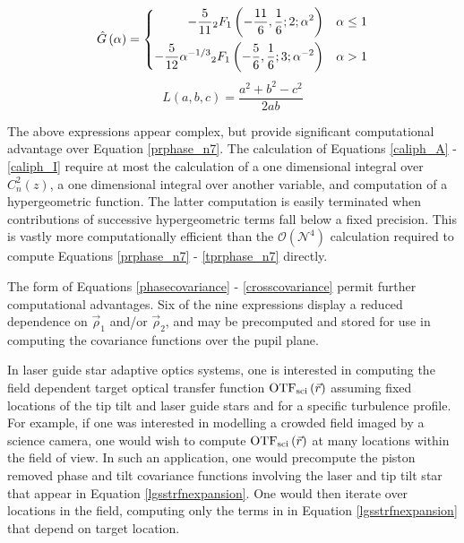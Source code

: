 \begin{equation}\label{G_hat_eqn}
\hat{G}\left(\alpha\right) = 
\left\{
\begin{aligned}
-\frac{5}{11} \vphantom{F}_{2}F_{1}\left(-\frac{11}{6}, \frac{1}{6};2; \alpha^{2}\right)              & \quad \alpha\le 1 \\
-\frac{5}{12} \alpha^{-1/3} \vphantom{F}_{2}F_{1}\left(-\frac{5}{6}, \frac{1}{6};3; \alpha^{-2}\right)  & \quad \alpha > 1
\end{aligned}
\right.
\end{equation}
\begin{equation}
L\left(a, b, c\right) = \frac{a^{2} + b^{2} - c^{2}}{2 a b}
\end{equation}

The above expressions appear complex, but provide significant
computational advantage over Equation \ref{prphase_n7}.  The
calculation of Equations \ref{caliph_A} - \ref{caliph_I} require at
most the calculation of a one dimensional integral over
$C_{n}^{2}(z)$, a one dimensional integral over another variable, and
computation of a hypergeometric function.  The latter computation is
easily terminated when contributions of successive hypergeometric
terms fall below a fixed precision.  This is vastly more
computationally efficient than the $\mathcal{O}(\mathcal{N}^{4})$
calculation required to compute Equations \ref{prphase_n7} -
\ref{tprphase_n7} directly.

The form of Equations \ref{phasecovariance} - \ref{crosscovariance}
permit further computational advantages.  Six of the nine expressions
display a reduced dependence on $\vec{\rho}_{1}$ and/or
$\vec{\rho}_{2}$, and may be precomputed and stored for use in
computing the covariance functions over the pupil plane.

In laser guide star adaptive optics systems, one is interested in
computing the field dependent target optical transfer function
${\rm OTF}_{\rm sci}\left(\vec{r}\right)$ assuming fixed locations of
the tip tilt and laser guide stars and for a specific turbulence
profile.  For example, if one was interested in modelling a crowded
field imaged by a science camera, one would wish to compute ${\rm OTF}_{\rm
  sci}\left(\vec{r}\right)$ at many locations within the field
of view.  In such an application, one would precompute the piston
removed phase and tilt covariance functions involving the laser and
tip tilt star that appear in Equation \ref{lgsstrfnexpansion}.  One
would then iterate over locations in the field, computing only the
terms in in Equation \ref{lgsstrfnexpansion} that depend on target
location.


